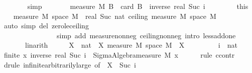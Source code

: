 \documentclass{article}
\theoremstyle{definition}
\begin{document}
\begin{isabellebody}
\ \ \ \ \ \ \isamarkupfalse%
\ simp\isanewline
\ \ \ \ \isamarkupfalse%
\ \isamarkupfalse%
\ {\isachardoublequoteopen}measure\ M\ B\ {\isasymge}\ card\ B\ {\isacharasterisk}\ inverse\ {\isacharparenleft}real\ {\isacharparenleft}Suc\ i{\isacharparenright}{\isacharparenright}{\isachardoublequoteclose}\ \isacommand{{\isachardot}}\isamarkupfalse%
\isanewline
\ \ \isacommand{{\isacharbraceright}}\isamarkupfalse%
\ \isamarkupfalse%
\ {\isacharasterisk}\ {\isacharequal}\ this\isanewline
\ \ \isamarkupfalse%
\ {\isachardoublequoteopen}measure\ M\ {\isacharparenleft}space\ M{\isacharparenright}\ {\isacharless}\ real\ {\isacharparenleft}Suc\ {\isacharparenleft}nat\ {\isacharparenleft}ceiling\ {\isacharparenleft}measure\ M\ {\isacharparenleft}space\ M{\isacharparenright}{\isacharparenright}{\isacharparenright}{\isacharparenright}{\isacharparenright}{\isachardoublequoteclose}\isanewline
\ \ \ \ \isamarkupfalse%
\ {\isacharparenleft}auto\ simp\ del{\isacharcolon}\ zero{\isacharunderscore}le{\isacharunderscore}ceiling\isanewline
\ \ \ \ \ \ \ \ \ \ \ \ \ \ \ \ simp\ add{\isacharcolon}\ measure{\isacharunderscore}nonneg\ ceiling{\isacharunderscore}nonneg\ intro{\isacharbang}{\isacharcolon}\ less{\isacharunderscore}add{\isacharunderscore}one{\isacharparenright}\isanewline
\ \ \ \ \ \ \ linarith\isanewline
\ \ \isamarkupfalse%
\ \isamarkupfalse%
\ X\ {\isacharcolon}{\isacharcolon}\ nat\ \ X{\isacharcolon}\ {\isachardoublequoteopen}measure\ M\ {\isacharparenleft}space\ M{\isacharparenright}\ {\isacharless}\ X{\isachardoublequoteclose}\ \isacommand{{\isachardot}{\isachardot}}\isamarkupfalse%
\isanewline
\ \ \isanewline
\ \ \isacommand{{\isacharbraceleft}}\isamarkupfalse%
\ \isamarkupfalse%
\ i\ {\isacharcolon}{\isacharcolon}\ nat\isanewline
\ \ \isamarkupfalse%
\ {\isachardoublequoteopen}finite\ {\isacharbraceleft}x{\isachardot}\ inverse\ {\isacharparenleft}real\ {\isacharparenleft}Suc\ i{\isacharparenright}{\isacharparenright}\ {\isacharless}\ Sigma{\isacharunderscore}Algebra{\isachardot}measure\ M\ {\isacharbraceleft}x{\isacharbraceright}{\isacharbraceright}{\isachardoublequoteclose}\isanewline
\ \ \ \ \isamarkupfalse%
\ {\isacharparenleft}rule\ ccontr{\isacharparenright}\isanewline
\ \ \ \ \isamarkupfalse%
\ {\isacharparenleft}drule\ infinite{\isacharunderscore}arbitrarily{\isacharunderscore}large\ {\isacharbrackleft}of\ {\isacharunderscore}\ {\isachardoublequoteopen}X\ {\isacharasterisk}\ Suc\ i{\isachardoublequoteclose}{\isacharbrackright}{\isacharparenright}\isanewline

\end{isabellebody}
\end{document}
